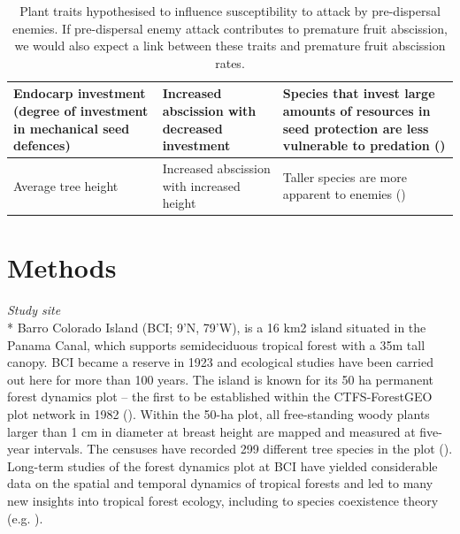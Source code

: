 \begin{table}
\begin{tabular}{|p{4cm}p{4cm}p{13cm}|}
        Endocarp investment (degree of investment in mechanical seed defences) & Increased abscission with decreased investment & Species that invest large amounts of resources in seed protection are less vulnerable to predation (\cite{benkmanImpactTreeSquirrels1995, rodgersonMechanicalDefenseSeeds1998,gathuaEffectsPrimatesSquirrels2000,kuprewiczMammalInsectPredation2010}) \\ \hline
        Average tree height & Increased abscission with increased height & Taller species are more apparent to enemies (\cite{gripenbergHighlyResolvedFood2019, janzenHostPlantsIslands1968}) \\ \hline

\end{tabular}
\caption{Plant traits hypothesised to influence susceptibility to attack by pre-dispersal enemies. If pre-dispersal enemy attack contributes to premature fruit abscission, we would also expect a link between these traits and premature fruit abscission rates.}
\label{tab:traits}
\end{table}


\section{Methods}
\emph{Study site}\\*
Barro Colorado Island (BCI; 9’N, 79’W), is a 16 km2 island situated in the Panama Canal, which supports semideciduous tropical forest with a 35m tall canopy. BCI became a reserve in 1923 and ecological studies have been carried out here for more than 100 years. The island is known for its 50 ha permanent forest dynamics plot – the first to be established within the CTFS-ForestGEO plot network in 1982 (\cite{anderson-teixeiraCTFSForestGEOWorldwideNetwork2015}). Within the 50-ha plot, all free-standing woody plants larger than 1 cm in diameter at breast height are mapped and measured at five-year intervals. The censuses have recorded 299 different tree species in the plot (\cite{ anderson-teixeiraCTFSForestGEOWorldwideNetwork2015}). Long-term studies of the forest dynamics plot at BCI have yielded considerable data on the spatial and temporal dynamics of tropical forests and led to many new insights into tropical forest ecology, including to species coexistence theory (e.g. \cite{conditBetaDiversityTropicalForest2002, comitaTestingPredictionsJanzenConnell2014, harmsPervasiveDensitydependentRecruitment2000}).

